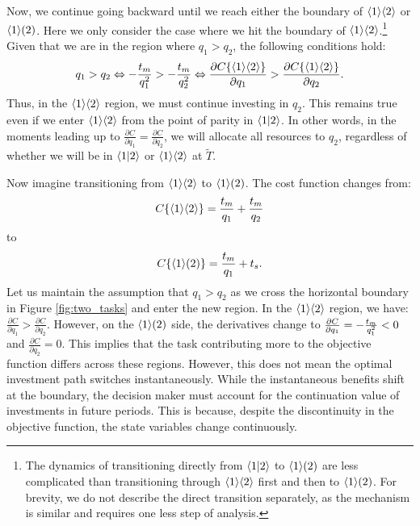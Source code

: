 \documentclass{article}
\theoremstyle{plain}
\theoremstyle{plain}
\begin{document}
Now, we continue going backward until we reach either the boundary of $\langle 1 \rangle\langle 2 \rangle$ or $\langle 1 \rangle( 2 )$.  
Here we only consider the case where we hit the boundary of $\langle 1 \rangle\langle 2 \rangle$.\footnote{The dynamics of transitioning directly from $\langle 1|2 \rangle$ to $\langle 1 \rangle( 2 )$ are less complicated than transitioning through $\langle 1 \rangle\langle 2 \rangle$ first and then to $\langle 1 \rangle( 2 )$.  
For brevity, we do not describe the direct transition separately, as the mechanism is similar and requires one less step of analysis.}  
Given that we are in the region where $q_{1}>q_{2}$, the following conditions hold:
\[
q_{1}>q_{2}\Leftrightarrow-\frac{t_{m}}{q_{1}^{2}}>-\frac{t_{m}}{q_{2}^{2}}\Leftrightarrow\frac{\partial C\{\langle 1 \rangle\langle 2 \rangle\}}{\partial q_{1}}>\frac{\partial C\{\langle 1 \rangle\langle 2 \rangle\}}{\partial q_{2}}.
\]
Thus, in the $\langle 1 \rangle\langle 2 \rangle$ region, we must continue investing in $q_{2}$.  
This remains true even if we enter $\langle 1 \rangle\langle 2 \rangle$ from the point of parity in $\langle 1|2 \rangle$.  
In other words, in the moments leading up to $\frac{\partial C}{\partial q_{1}}=\frac{\partial C}{\partial q_{2}}$, we will allocate all resources to $q_{2}$, regardless of whether we will be in $\langle 1|2 \rangle$ or $\langle 1 \rangle\langle 2 \rangle$ at $\tilde{T}$.

Now imagine transitioning from $\langle 1 \rangle\langle 2 \rangle$ to $\langle 1 \rangle( 2 )$.  
The cost function changes from:
\[
C\{\langle 1 \rangle\langle 2 \rangle\}=\frac{t_{m}}{q_{1}}+\frac{t_{m}}{q_{2}}
\]
to 
\[
C\{\langle 1 \rangle( 2 )\}=\frac{t_{m}}{q_{1}}+t_{s}.
\]
Let us maintain the assumption that $q_{1}>q_{2}$ as we cross the horizontal boundary in Figure \ref{fig:two_tasks} and enter the new region.  
In the $\langle 1 \rangle\langle 2 \rangle$ region, we have: $\frac{\partial C}{\partial q_{1}}>\frac{\partial C}{\partial q_{2}}$.  
However, on the $\langle 1 \rangle( 2 )$ side, the derivatives change to $\frac{\partial C}{\partial q_{1}}=-\frac{t_{m}}{q_{1}^{2}}<0$ and $\frac{\partial C}{\partial q_{2}}=0$.  
This implies that the task contributing more to the objective function differs across these regions.  
However, this does not mean the optimal investment path switches instantaneously.  
While the instantaneous benefits shift at the boundary, the decision maker must account for the continuation value of investments in future periods.  
This is because, despite the discontinuity in the objective function, the state variables change continuously.
\end{document}
